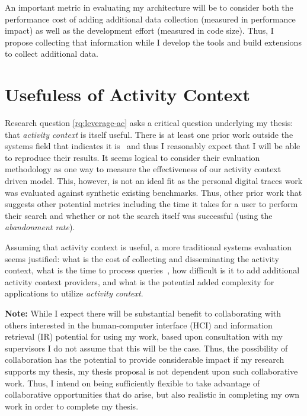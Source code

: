 An important metric in evaluating my architecture will be to consider both the
performance cost of adding additional data collection (measured in performance
impact) as well as the development effort (measured in code size).  Thus, I
propose collecting that information while I develop the tools and build
extensions to collect additional data.

\section{Usefuless of Activity Context}
\label{ch:evaluation:sec:activity-context}

Research question \ref{rq:leverage-ac} asks a critical question underlying my
thesis: that \emph{activity context} is itself useful.  There is at least one
prior work outside the systems field that indicates it
is~\cite{vianna2019searching} and thus I reasonably expect that I will be able
to reproduce their results.  It seems logical to consider their evaluation
methodology as one way to measure the effectiveness of our activity context
driven model.  This, however, is not an ideal fit as the personal digital traces
work was evaluated against synthetic existing benchmarks.  Thus, other prior
work that suggests other potential metrics including the time it takes for a
user to perform their search and whether or not the search itself was successful
(using the \emph{abandonment rate}).

Assuming that activity context is useful, a more traditional systems evaluation
seems justified: what is the cost of collecting and disseminating the activity
context, what is the time to process queries~\cite{ames2013qmds}, how difficult
is it to add additional activity context providers, and what is the potential
added complexity for applications to utilize \emph{activity context}.

\textbf{Note:} While I expect there will be substantial benefit to collaborating
with others interested in the human-computer interface (HCI) and information
retrieval (IR) potential for using my work, based upon consultation with my
supervisors I do not assume that this will be the case.  Thus, the possibility of
collaboration has the potential to provide considerable impact if my research
supports my thesis, my thesis proposal is not dependent upon such collaborative
work. Thus, I intend on being sufficiently flexible to take advantage of
collaborative opportunities that do arise, but also realistic in completing my
own work in order to complete my thesis.

